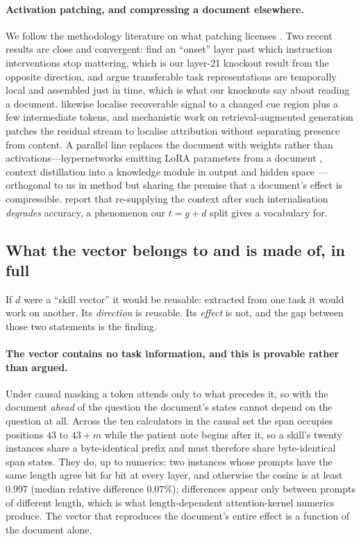 \documentclass{article}
\newcommand{\dvec}{\ensuremath{d}}
\newcommand{\gvec}{\ensuremath{g}}
\newcommand{\tvec}{\ensuremath{t}}
\begin{document}
\paragraph{Activation patching, and compressing a document elsewhere.}
We follow the methodology literature on what patching licenses
\citep{zhang2023bestpractices, heimersheim2024patching}. Two recent results are
close and convergent: \citet{onset2025instruction} find an ``onset'' layer past
which instruction interventions stop mattering, which is our layer-21 knockout
result from the opposite direction, and \citet{jit2025taskrepr} argue
transferable task representations are temporally local and assembled just in
time, which is what our knockouts say about reading a document.
\citet{semanticconflicts2026} likewise localise recoverable signal to a changed
cue region plus a few intermediate tokens, and mechanistic work on
retrieval-augmented generation \citep{ragcite2026} patches the residual stream
to localise attribution without separating presence from content. A parallel
line replaces the document with weights rather than activations---hypernetworks
emitting LoRA parameters from a document \citep{doc2lora2026}, context
distillation into a knowledge module in output and hidden space
\citep{deepcontextdistill2025}---orthogonal to us in method but sharing the
premise that a document's effect is compressible.
\citet{contextreturns2026} report that re-supplying the context after such
internalisation \emph{degrades} accuracy, a phenomenon our $\tvec=\gvec+\dvec$
split gives a vocabulary for.




\subsection{What the vector belongs to and is made of, in full}
\label{app:belongs}

If $\dvec$ were a ``skill vector'' it would be reusable: extracted from one task
it would work on another. Its \emph{direction} is reusable. Its \emph{effect} is
not, and the gap between those two statements is the finding.

\paragraph{The vector contains no task information, and this is provable rather
than argued.} Under causal masking a token attends only to what precedes it, so
with the document \emph{ahead} of the question the document's states cannot
depend on the question at all. Across the ten calculators in the causal set the
span occupies positions $43$ to $43+m$ while the patient note begins after it,
so a skill's twenty instances share a byte-identical prefix and must therefore
share byte-identical span states. They do, up to numerics: two instances whose
prompts have the same length agree bit for bit at every layer, and otherwise the
cosine is at least $0.997$ (median relative difference $0.07\%$); differences
appear only between prompts of different length, which is what length-dependent
attention-kernel numerics produce. The vector that reproduces the document's
entire effect is a function of the document alone.
\end{document}

